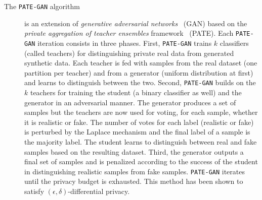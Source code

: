 \documentclass{article}
\begin{document}
\begin{description}
\item[The \texttt{PATE-GAN} algorithm~\cite{Jordon2019PATEGANGS}] is
  an extension of \emph{generative adversarial networks}~\cite{goodfellow2014generative} (GAN) based
  on the \emph{private aggregation of teacher ensembles} framework~\cite{Papernot2016SemisupervisedKT}
  (PATE).
  Each \texttt{PATE-GAN} iteration consists in three phases.
  First, \texttt{PATE-GAN} trains $k$ classifiers (called teachers)
  for distinguishing private real data from generated synthetic data.
  Each teacher is fed with samples from the real dataset (one
  partition per teacher) and from a generator (uniform distribution at
  first) and learns to distinguish between the two.
  Second, \texttt{PATE-GAN} builds on the $k$ teachers for training the
  student (a binary classifier as well) and the generator in an
  adversarial manner.
  The generator produces a set of samples but the teachers are now used for voting, for each sample, whether it is realistic or fake.
  The number of votes for each label (realistic or
  fake) is perturbed by the Laplace mechanism and the final label of a
  sample is the majority label.
  The student learns to distinguish between real and fake samples based on the resulting dataset.
  Third, the generator outputs a final set of samples and is penalized
  according to the success of the student in distinguishing realistic
  samples from fake samples.
  \texttt{PATE-GAN} iterates until the
  privacy budget is exhausted.
  This method has been shown to satisfy $(\epsilon, \delta)$-differential privacy.
\end{description}
\end{document}
